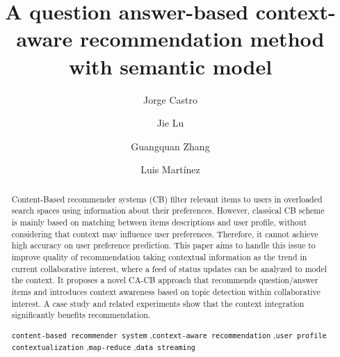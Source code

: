\documentclass[preprint]{elsarticle}
\begin{document}
\title{A question answer-based context-aware recommendation method with semantic model}

\begin{spacing}{1.5}

\begin{frontmatter}

\author[addressjorge,addressjie]{Jorge Castro}

\author[addressjie]{Jie Lu}

\author[addressjie]{Guangquan Zhang}

\author[addressluis]{Luis Mart\'inez}

\address[addressjorge]{Department of Computer Science and Artificial Intelligence, University of Granada, Granada (Spain)}
\address[addressjie]{School of Software, University of Technology Sydney, Sydney (Australia)}
\address[addressluis]{Computer Science Department, University of Ja\'en, Ja\'en (Spain)}

\begin{abstract}

Content-Based recommender systems (CB) filter relevant items to users in overloaded search spaces using information about their preferences. However, classical CB scheme is mainly based on matching between items descriptions and user profile, without considering that context may influence user preferences. Therefore, it cannot achieve high accuracy on user preference prediction. This paper aims to handle this issue to improve quality of recommendation taking contextual information as the trend in current collaborative interest, where a feed of status updates can be analyzed to model the context. It proposes a novel CA-CB approach that recommends question/answer items and introduces context awareness based on topic detection within collaborative interest. A case study and related experiments show that the context integration significantly benefits recommendation.

\begin{keyword}
   \texttt{content-based recommender system} \sep \texttt{context-aware recommendation} \sep \texttt{user profile contextualization} \sep \texttt{map-reduce} \sep \texttt{data streaming}
\end{keyword}
\end{abstract}

\end{frontmatter}


\end{spacing}
\end{document}
